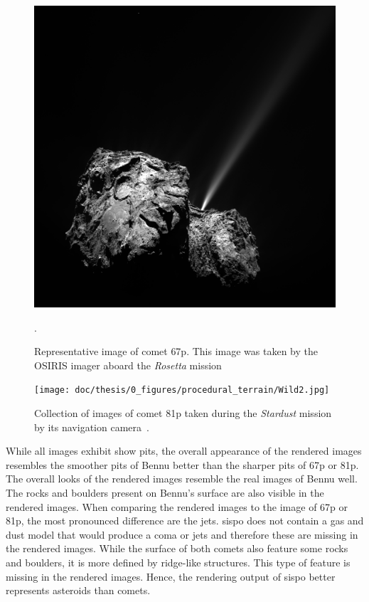 \begin{figure}[htb]
    \centering
    \includegraphics[width=.8\textwidth]{doc/thesis/0_figures/procedural_terrain/67P_CG.PNG}
    \caption{Representative image of comet \acrlong{67p}. This image was taken by the OSIRIS imager aboard the \textit{Rosetta} mission~\cite{OSIRISArchiveb}}.
    \label{fig:render_quali_67p}
\end{figure}

\begin{figure}[htb]
    \centering
    \texttt{[image: doc/thesis/0\_figures/procedural\_terrain/Wild2.jpg]}
    \caption{Collection of images of comet \acrlong{81p} taken during the \textit{Stardust} mission by its navigation camera~\cite{StardustImages}.}
    \label{fig:render_quali_81p}
\end{figure}

While all images exhibit show pits, the overall appearance of the rendered images resembles the smoother pits of Bennu better than the sharper pits of \gls{67p} or \gls{81p}. The overall looks of the rendered images resemble the real images of Bennu well. The rocks and boulders present on Bennu's surface are also visible in the rendered images. When comparing the rendered images to the image of \gls{67p} or \gls{81p}, the most pronounced difference are the jets. \Gls{sispo} does not contain a gas and dust model that would produce a coma or jets and therefore these are missing in the rendered images. While the surface of both comets also feature some rocks and boulders, it is more defined by ridge-like structures. This type of feature is missing in the rendered images. Hence, the rendering output of \gls{sispo} better represents asteroids than comets.

